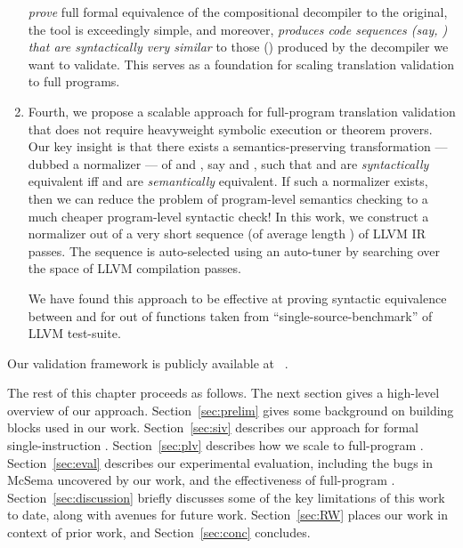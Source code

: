 \begin{enumerate}
  \emph{prove} full formal equivalence of the compositional decompiler to the original,
  the tool is exceedingly simple, and moreover, 
  \emph{produces code sequences (say, \Tp) that are syntactically very similar} to those 
  () produced by the decompiler we want to validate.
  This serves as a foundation for scaling translation validation to full programs.
%
  \item Fourth, we propose a scalable approach for full-program translation validation
  that does not require heavyweight symbolic execution or theorem provers.  Our key 
  insight is that there exists a semantics-preserving transformation --- dubbed a  
  normalizer --- of \T and \TP, say  and , such 
  that
   and  are \emph{syntactically} equivalent iff  
  and  are \emph{semantically} equivalent.  If such a normalizer
  exists, then we can reduce the problem of program-level semantics checking to
  a much cheaper program-level syntactic check!  In this work, we construct a 
  normalizer out of a very short sequence (of average length \avgPassLength) of LLVM IR passes. 
  The sequence is auto-selected using an auto-tuner by searching over the space of 
  LLVM compilation passes.
   
   We have found this approach to be effective at proving
  syntactic equivalence between  and \Tp for \plvP out of \plvT functions
  taken from  ``single-source-benchmark'' of LLVM test-suite.
\end{enumerate}

Our validation framework is publicly available at ~\cite{lifter-validator-github}.

%
The rest of this chapter proceeds as follows.
%
The next section gives a high-level overview of our approach.
%
Section~\ref{sec:prelim} gives some background on building blocks used in our work.
%
Section~\ref{sec:siv} describes our approach for formal single-instruction \TV.
%
Section~\ref{sec:plv} describes how we scale to full-program \TV.
%
Section~\ref{sec:eval} describes our experimental evaluation, including the bugs 
in McSema uncovered by our work, and the effectiveness of full-program \TV.
%
Section~\ref{sec:discussion} briefly discusses some of the key limitations of this work
to date, along with avenues for future work.
%
Section~\ref{sec:RW} places our work in context of prior work, and
Section~\ref{sec:conc} concludes.



